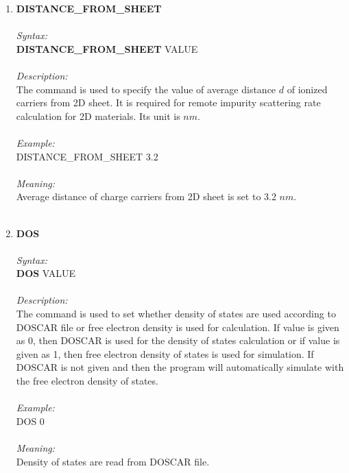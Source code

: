 \documentclass[12pt]{article}
\begin{document}
\begin{enumerate}
    \item \textbf{DISTANCE\_FROM\_SHEET} \\ \\
    \textit{Syntax:} \\
    \textbf{DISTANCE\_FROM\_SHEET} VALUE \\ \\
    \textit{Description:} \\
    The command is used to specify the value of average distance $d$ of ionized carriers from 2D sheet. It is required for remote impurity scattering rate calculation for 2D materials. Its unit is $nm$. \\ \\
    \textit{Example:} \\
    DISTANCE\_FROM\_SHEET 3.2 \\ \\
    \textit{Meaning:} \\    
    Average distance of charge carriers from 2D sheet is set to 3.2 $nm$. \\ \\
    
    \item \textbf{DOS}  \\ \\
    \textit{Syntax:} \\
    \textbf{DOS} VALUE \\ \\ 
    \textit{Description:} \\
    The command is used to set whether density of states are used according to DOSCAR file or free electron density is used for calculation. If value is given as 0, then DOSCAR is used for the density of states calculation or if value is given as 1, then free electron density of states is used for simulation. If DOSCAR is not given and then the program will automatically simulate with the free electron density of states. \\ \\
    \textit{Example:} \\
    DOS 0 \\ \\
    \textit{Meaning:} \\    
    Density of states are read from DOSCAR file. \\ \\
    

\end{enumerate}
\end{document}
